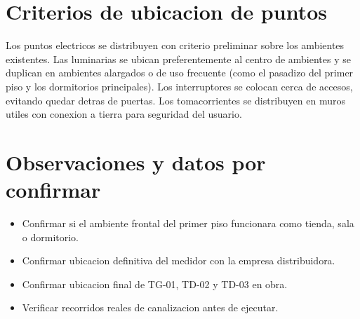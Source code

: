 \section{Criterios de ubicacion de puntos}

Los puntos electricos se distribuyen con criterio preliminar sobre los ambientes existentes. Las luminarias se ubican preferentemente al centro de ambientes y se duplican en ambientes alargados o de uso frecuente (como el pasadizo del primer piso y los dormitorios principales). Los interruptores se colocan cerca de accesos, evitando quedar detras de puertas. Los tomacorrientes se distribuyen en muros utiles con conexion a tierra para seguridad del usuario.

\section{Observaciones y datos por confirmar}

\begin{itemize}
  \item Confirmar si el ambiente frontal del primer piso funcionara como tienda, sala o dormitorio.
  \item Confirmar ubicacion definitiva del medidor con la empresa distribuidora.
  \item Confirmar ubicacion final de TG-01, TD-02 y TD-03 en obra.
  \item Verificar recorridos reales de canalizacion antes de ejecutar.
\end{itemize}
